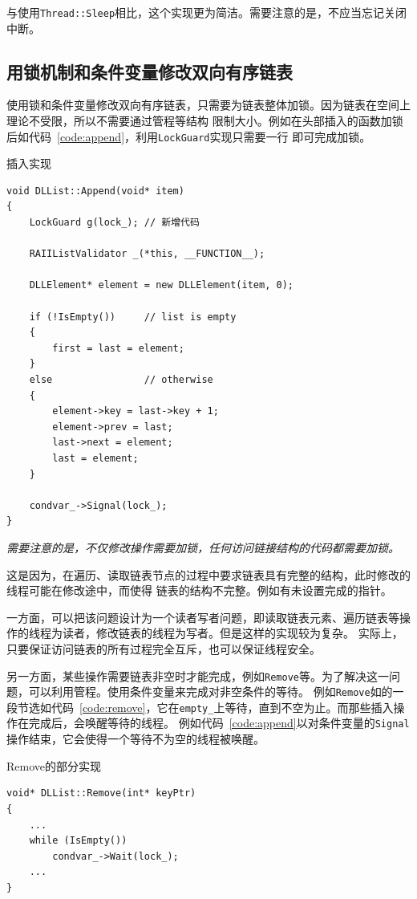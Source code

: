 \documentclass[a4paper,twoside]{article}
\begin{document}
\begin{spacing}{1.2}
与使用\texttt{Thread::Sleep}相比，这个实现更为简洁。需要注意的是，不应当忘记关闭中断。

\subsection{用锁机制和条件变量修改双向有序链表}

使用锁和条件变量修改双向有序链表，只需要为链表整体加锁。因为链表在空间上理论不受限，所以不需要通过管程等结构
限制大小。例如在头部插入的函数加锁后如代码~\ref{code:append}，利用\texttt{LockGuard}实现只需要一行
即可完成加锁。

\begin{listing}[htb]
	\caption{插入实现}
	\label{code:append}
	\begin{verbatim}
void DLList::Append(void* item)
{
	LockGuard g(lock_); // 新增代码

	RAIIListValidator _(*this, __FUNCTION__);

	DLLElement* element = new DLLElement(item, 0);

	if (!IsEmpty())		// list is empty
	{
		first = last = element;
	}
	else				// otherwise
	{
		element->key = last->key + 1;
		element->prev = last;
		last->next = element;
		last = element;
	}

	condvar_->Signal(lock_);
}
	\end{verbatim}
\end{listing}

\emph{需要注意的是，不仅修改操作需要加锁，任何访问链接结构的代码都需要加锁。}

这是因为，在遍历、读取链表节点的过程中要求链表具有完整的结构，此时修改的线程可能在修改途中，而使得
链表的结构不完整。例如有未设置完成的指针。

一方面，可以把该问题设计为一个读者写者问题，即读取链表元素、遍历链表等操作的线程为读者，修改链表的线程为写者。但是这样的实现较为复杂。
实际上，只要保证访问链表的所有过程完全互斥，也可以保证线程安全。

另一方面，某些操作需要链表非空时才能完成，例如\texttt{Remove}等。为了解决这一问题，可以利用管程。使用条件变量来完成对非空条件的等待。
例如\texttt{Remove}如的一段节选如代码~\ref{code:remove}，它在\texttt{empty\_}上等待，直到不空为止。而那些插入操作在完成后，会唤醒等待的线程。
例如代码~\ref{code:append}以对条件变量的\texttt{Signal}操作结束，它会使得一个等待不为空的线程被唤醒。
\begin{listing}[H]
	\caption{Remove的部分实现}
	\label{code:remove}
	\begin{verbatim}
void* DLList::Remove(int* keyPtr)
{
	...
	while (IsEmpty())
		condvar_->Wait(lock_);	
	...
}
	\end{verbatim}
\end{listing}


\end{spacing}
\end{document}
